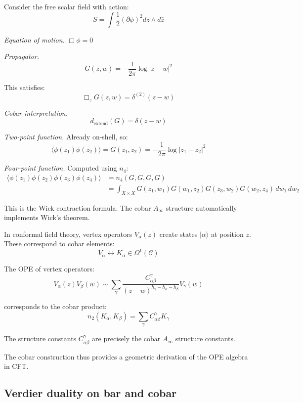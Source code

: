 \begin{example}\label{ex:free-scalar-cobar}

Consider the free scalar field with action:
\[S = \int \frac{1}{2} (\partial \phi)^2 dz \wedge d\bar{z}\]

\emph{Equation of motion.} $\Box \phi = 0$

\emph{Propagator.}
\[G(z,w) = -\frac{1}{2\pi} \log|z - w|^2\]

This satisfies:
\[\Box_z G(z,w) = \delta^{(2)}(z - w)\]

\emph{Cobar interpretation.}
\[d_{\text{extend}}(G) = \delta(z - w)\]

\emph{Two-point function.} Already on-shell, so:
\[\langle \phi(z_1) \phi(z_2) \rangle = G(z_1, z_2) = -\frac{1}{2\pi} \log|z_1 - z_2|^2\]

\emph{Four-point function.} Computed using $n_4$:
\begin{align*}
\langle \phi(z_1) \phi(z_2) \phi(z_3) \phi(z_4) \rangle &= n_4(G, G, G, G) \\
&= \int_{X \times X} G(z_1, w_1) G(w_1, z_2) G(z_3, w_2) G(w_2, z_4) \,
dw_1 \, dw_2
\end{align*}

This is the Wick contraction formula. The cobar $A_\infty$ structure
automatically implements Wick's theorem.
\end{example}

\begin{remark}\label{rem:vertex-operators-cobar}
In conformal field theory, vertex operators $V_\alpha(z)$ create states $|\alpha\rangle$ 
at position $z$. These correspond to cobar elements:
\[V_\alpha \leftrightarrow K_\alpha \in \Omega^1(\mathcal{C})\]

The OPE of vertex operators:
\[V_\alpha(z) V_\beta(w) \sim \sum_\gamma \frac{C_{\alpha\beta}^\gamma}{(z-w)^{h_\gamma - h_\alpha - h_\beta}} V_\gamma(w)\]

corresponds to the cobar product:
\[n_2(K_\alpha, K_\beta) = \sum_\gamma C_{\alpha\beta}^\gamma K_\gamma\]

The structure constants $C_{\alpha\beta}^\gamma$ are precisely the cobar $A_\infty$ 
structure constants.

The cobar construction thus provides a geometric derivation
of the OPE algebra in CFT.
\end{remark}

\subsection{Verdier duality on bar and cobar}


